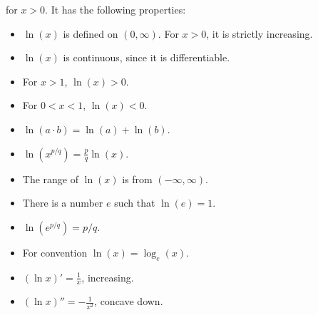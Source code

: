 \begin{itemize}
    for $x>0$. It has the following properties:
    \begin{itemize}
        \item $\ln(x)$ is defined on $(0,\infty)$. For $x>0$, it is strictly increasing.
        \item $\ln(x)$ is continuous, since it is differentiable.
        \item For $x>1$, $\ln(x)>0$.
        \item For $0<x<1$, $\ln(x)<0$.
        \item $\ln(a\cdot b) = \ln(a)+\ln(b)$.
        \item $\ln(x^{p/q}) = \frac{p}{q}\ln(x)$.
        \item The range of $\ln(x)$ is from $(-\infty,\infty)$.
        \item There is a number $e$ such that $\ln(e)=1$.
        \item $\ln(e^{p/q})=p/q$.
        \item For convention $\ln(x)=\log_e(x)$.
        \item $(\ln x)' = \frac{1}{x}$, increasing.
        \item $(\ln x)'' = -\frac{1}{x^2}$, concave down.
    \end{itemize}
\end{itemize}